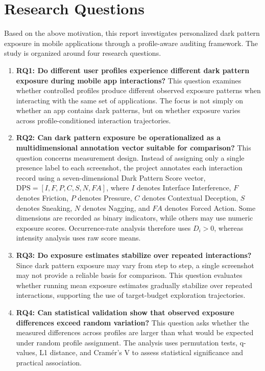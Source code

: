 \section{Research Questions}

Based on the above motivation, this report investigates personalized dark pattern exposure in mobile applications through a profile-aware auditing framework. The study is organized around four research questions.

\begin{enumerate}
\item \textbf{RQ1: Do different user profiles experience different dark pattern exposure during mobile app interactions?}
This question examines whether controlled profiles produce different observed exposure patterns when interacting with the same set of applications. The focus is not simply on whether an app contains dark patterns, but on whether exposure varies across profile-conditioned interaction trajectories.

\item \textbf{RQ2: Can dark pattern exposure be operationalized as a multidimensional annotation vector suitable for comparison?}  
This question concerns measurement design. Instead of assigning only a single presence label to each screenshot, the project annotates each interaction record using a seven-dimensional Dark Pattern Score vector, \(\mathrm{DPS} = [I, F, P, C, S, N, FA]\), where \(I\) denotes Interface Interference, \(F\) denotes Friction, \(P\) denotes Pressure, \(C\) denotes Contextual Deception, \(S\) denotes Sneaking, \(N\) denotes Nagging, and \(FA\) denotes Forced Action. Some dimensions are recorded as binary indicators, while others may use numeric exposure scores. Occurrence-rate analysis therefore uses \(D_i>0\), whereas intensity analysis uses raw score means.

\item \textbf{RQ3: Do exposure estimates stabilize over repeated interactions?}  
Since dark pattern exposure may vary from step to step, a single screenshot may not provide a reliable basis for comparison. This question evaluates whether running mean exposure estimates gradually stabilize over repeated interactions, supporting the use of target-budget exploration trajectories.

\item \textbf{RQ4: Can statistical validation show that observed exposure differences exceed random variation?}  
This question asks whether the measured differences across profiles are larger than what would be expected under random profile assignment. The analysis uses permutation tests, q-values, L1 distance, and Cramér’s V to assess statistical significance and practical association.

\end{enumerate}

